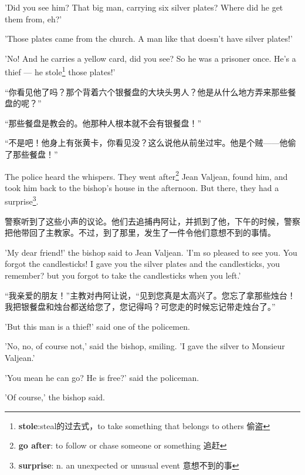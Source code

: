 \documentclass[fontset=ubuntu, zihao=5]{ctexart}
\begin{document}
\begin{paracol}{2}
  \switchcolumn*

  'Did you see him? That big man, carrying six silver plates? Where did he get them from, eh?'

  'Those plates came from the church. A man like that doesn't have silver plates!'

  'No! And he carries a yellow card, did you see? So he was a prisoner once.
  He's a thief --- he stole\footnote{\textbf{stole}:steal的过去式，to take
    something that belongs to others 偷盗} those plates!'

\switchcolumn

  “你看见他了吗？那个背着六个银餐盘的大块头男人？他是从什么地方弄来那些餐盘的呢？”

  “那些餐盘是教会的。他那种人根本就不会有银餐盘！”

  “不是吧！他身上有张黄卡，你看见没？这么说他从前坐过牢。他是个贼——他偷了那些餐盘！”

  \switchcolumn*

  The police heard the whispers. They went after\footnote{\textbf{go after}: to follow or chase someone or something 追赶} Jean Valjean, found him, and took him back to the bishop's house in the afternoon. But there, they had a surprise\footnote{\textbf{surprise}: n. an unexpected or unusual event 意想不到的事}.

  \switchcolumn
  警察听到了这些小声的议论。他们去追捕冉阿让，并抓到了他，下午的时候，警察把他带回了主教家。不过，到了那里，发生了一件令他们意想不到的事情。

  \switchcolumn*

  'My dear friend!' the bishop said to Jean Valjean. 'I'm so pleased to see you. You forgot the candlesticks! I gave you the silver plates and the candlesticks, you remember? but you forgot to take the candlesticks when you left.'

  \switchcolumn
  “我亲爱的朋友！”主教对冉阿让说，“见到您真是太高兴了。您忘了拿那些烛台！我把银餐盘和烛台都送给您了，您记得吗？可您走的时候忘记带走烛台了。”

  \switchcolumn*

  'But this man is a thief!' said one of the policemen.

  'No, no, of course not,' said the bishop, smiling. 'I gave the silver to Monsieur Valjean.'

  'You mean he can go? He is free?' said the policeman.

  'Of course,' the bishop said.

  \switchcolumn


\end{paracol}
\end{document}
